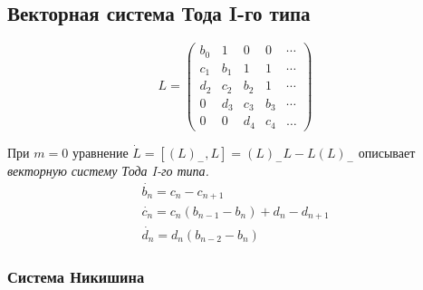 \documentclass[12pt, a4paper]{report}
\begin{document}
\subsection {Векторная система Тода I-го типа}

\begin{equation}
\label{Toda1}
L=
\left(\begin{array}{cccccccccccc}
b_0 & 1 & 0 & 0 &  \cdots \\
c_1 & b_1 & 1 & 1 &  \cdots \\
d_2 & c_2 & b_2 & 1 &  \cdots \\
0 & d_3 & c_3 & b_3 &  \cdots \\
0 & 0 & d_4 & c_4 & \ldots
\end{array}\right)
\end{equation}

При $m=0$ уравнение $\dot{L}=[(L)_{-},L]=(L)_{-}L-L(L)_{-}$ описывает \it векторную систему Тода I-го типа\rm. 
$$
\begin{array}{lllllllllllllll}
\dot{b_n} = c_{n} - c_{n+1} \\
\dot{c_n} = c_n (b_{n-1} - b_{n}) + d_n - d_{n+1} \\
\dot{d_n} = d_n (b_{n-2} - b_n)
\end{array}
$$

\subsubsection {Система Никишина}
\end{document}
